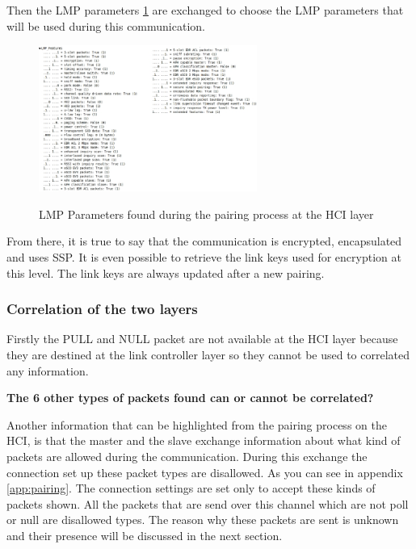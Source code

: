 Then the LMP parameters \ref{fig:lmp} are exchanged to choose the LMP parameters that will be used during this communication. 
\begin{figure}[!h]
  \begin{center}
	\includegraphics[width=270px]{images/LMP_PARAM.jpg}
	\label{fig:lmp}
	\caption{LMP Parameters found during the pairing process at the HCI layer}
  \end{center}
\end{figure}

From there, it is true to say that the communication is encrypted, encapsulated and uses SSP. It is even possible to retrieve the link keys used for encryption at this level. The link keys are always updated after a new pairing. 


\subsubsection{Correlation of the two layers}

Firstly the PULL and NULL packet are not available at the HCI layer because they are destined at the link controller layer so they cannot be used to correlated any information. 


\textbf{The 6 other types of packets found can or cannot be correlated?}

Another information that can be highlighted from the pairing process on the HCI, is that the master and the slave exchange information about what kind of packets are allowed during the communication. During this exchange the connection set up these packet types are disallowed. As you can see in appendix \ref{app:pairing}. The connection settings are set only to accept these kinds of packets shown. All the packets that are send over this channel which are not poll or null are disallowed types. The reason why these packets are sent is unknown and their presence will be discussed in the next section.  \pend



